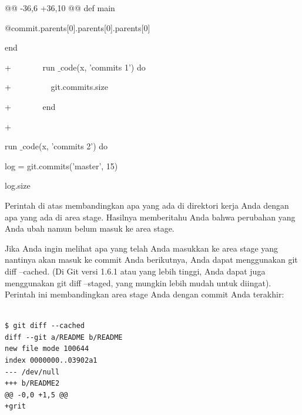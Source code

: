\noindent 
{\fontsize{14pt}{14pt}\selectfont @@ -36,6 +36,10 @@ def main \\} \par
\noindent 
{\fontsize{14pt}{14pt}\selectfont @commit.parents[0].parents[0].parents[0] \\} \par
\noindent 
{\fontsize{14pt}{14pt}\selectfont end \\} \par
\vspace{14pt}
\noindent 
{\fontsize{14pt}{14pt}\selectfont +~~~~~~~ run $  \_  $code(x, 'commits 1') do \\} \par
\noindent 
{\fontsize{14pt}{14pt}\selectfont +~~~~~~~~~ git.commits.size \\} \par
\noindent 
{\fontsize{14pt}{14pt}\selectfont +~~~~~~~ end \\} \par
\noindent 
{\fontsize{14pt}{14pt}\selectfont + \\} \par
\noindent 
{\fontsize{14pt}{14pt}\selectfont run $  \_  $code(x, 'commits 2') do \\} \par
\noindent 
{\fontsize{14pt}{14pt}\selectfont log = git.commits('master', 15) \\} \par
\noindent 
{\fontsize{14pt}{14pt}\selectfont log.size \\} \par
\vspace{14pt}
\noindent 
{\fontsize{14pt}{14pt}\selectfont Perintah di atas membandingkan apa yang ada di direktori kerja Anda dengan apa yang ada di area stage. Hasilnya memberitahu Anda bahwa perubahan yang Anda ubah namun belum masuk ke area stage. \\} \par
\vspace{14pt}
\noindent 
{\fontsize{14pt}{14pt}\selectfont Jika Anda ingin melihat apa yang telah Anda masukkan ke area stage yang nantinya akan masuk ke commit Anda berikutnya, Anda dapat menggunakan $  $git diff --cached. (Di Git versi 1.6.1 atau yang lebih tinggi, Anda dapat juga menggunakan $  $git diff --staged, yang mungkin lebih mudah untuk diingat). Perintah ini membandingkan area stage Anda dengan commit Anda terakhir: \\} \par
\begin{verbatim}

$ git diff --cached
diff --git a/README b/README
new file mode 100644
index 0000000..03902a1
--- /dev/null
+++ b/README2
@@ -0,0 +1,5 @@
+grit

\end{verbatim}
